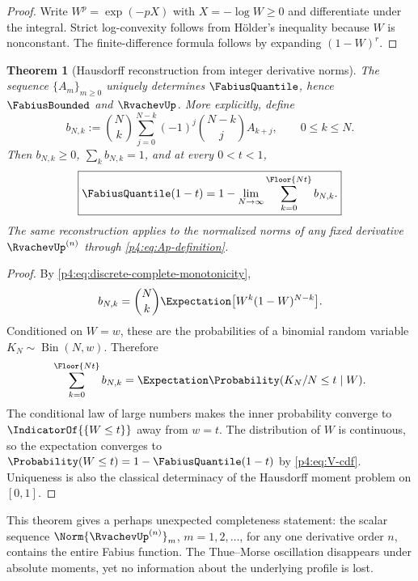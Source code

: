 \documentclass[11pt,oneside]{article}
\newtheorem{theorem}{Theorem}[section]
\theoremstyle{definition}
\theoremstyle{remark}
\begin{document}
\begin{proof}
Write $W^p=\exp(-pX)$ with $X=-\log W\geq0$ and differentiate under the integral.
Strict log-convexity follows from H\"older's inequality because $W$ is nonconstant.
The finite-difference formula follows by expanding $(1-W)^r$.
\end{proof}

\begin{theorem}[Hausdorff reconstruction from integer derivative norms]
\label{p4:thm:hausdorff-reconstruction}
The sequence $\{A_m\}_{m\geq0}$ uniquely determines $\FabiusQuantile$, hence
$\FabiusBounded$ and $\RvachevUp$.
More explicitly, define
\begin{equation}
 b_{N,k}:=\binom Nk
 \sum_{j=0}^{N-k}(-1)^j\binom{N-k}{j}A_{k+j},
 \qquad0\leq k\leq N.
 \label{p4:eq:bernstein-masses}
\end{equation}
Then $b_{N,k}\geq0$, $\sum_kb_{N,k}=1$, and at every $0<t<1$,
\begin{equation}
 \boxed{
 \FabiusQuantile(1-t)=1-\lim_{N\to\infty}
 \sum_{k=0}^{\Floor{Nt}}b_{N,k}.}
 \label{p4:eq:G-from-norms}
\end{equation}
The same reconstruction applies to the normalized norms of any fixed derivative
$\RvachevUp^{(n)}$ through \eqref{p4:eq:Ap-definition}.
\end{theorem}

\begin{proof}
By \eqref{p4:eq:discrete-complete-monotonicity},
\[
 b_{N,k}=\binom Nk\Expectation\bigl[W^k(1-W)^{N-k}\bigr].
\]
Conditioned on $W=w$, these are the probabilities of a binomial random variable
$K_N\sim\operatorname{Bin}(N,w)$.  Therefore
\[
 \sum_{k=0}^{\Floor{Nt}}b_{N,k}
 =\Expectation\Probability(K_N/N\leq t\mid W).
\]
The conditional law of large numbers makes the inner probability converge to
$\IndicatorOf{\{W\leq t\}}$ away from $w=t$.  The distribution of $W$ is continuous,
so the
expectation converges to
$\Probability(W\leq t)=1-\FabiusQuantile(1-t)$ by
\eqref{p4:eq:V-cdf}.  Uniqueness is also the classical determinacy of the Hausdorff moment
problem on $[0,1]$.
\end{proof}

\begin{remark}
This theorem gives a perhaps unexpected completeness statement: the scalar sequence
$\Norm{\RvachevUp^{(n)}}_m$, $m=1,2,\ldots$, for any one derivative order $n$, contains the entire
Fabius function.  The Thue--Morse oscillation disappears under absolute moments, yet no
information about the underlying profile is lost.
\end{remark}
\end{document}
